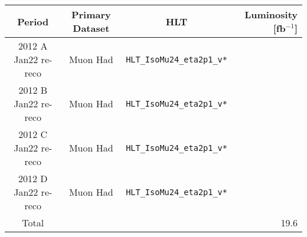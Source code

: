 \begin{table}[h]
\begin{centering}
\begin{tabular}{c|c|c|r} \hline \hline
Period & Primary Dataset  & HLT & Luminosity [fb$^{-1}$] \\
\hline
2012 A Jan22 re-reco & Muon Had & \verb+HLT_IsoMu24_eta2p1_v*+ & \\
2012 B Jan22 re-reco & Muon Had & \verb+HLT_IsoMu24_eta2p1_v*+ & \\
2012 C Jan22 re-reco & Muon Had & \verb+HLT_IsoMu24_eta2p1_v*+ & \\
2012 D Jan22 re-reco & Muon Had & \verb+HLT_IsoMu24_eta2p1_v*+ & \\
\hline
Total & & & 19.6 \\
\hline \hline
\end{tabular}
\end{centering}
\end{table}
